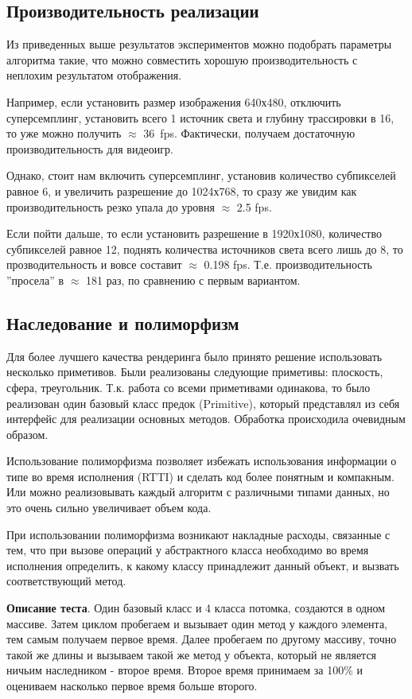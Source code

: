 \documentclass[12pt, a4paper, utf8]{article}
\begin{document}
\subsection{Производительность реализации}

Из приведенных выше результатов экспериментов можно подобрать параметры алгоритма такие, что можно совместить хорошую производительность с неплохим результатом отображения. 

Например, если установить размер изображения 640х480, отключить суперсемплинг, установить всего 1 источник света и глубину трассировки в 16, то уже можно получить $\approx$ 36~fps. Фактически, получаем достаточную производительность для видеоигр.

Однако, стоит нам включить суперсемплинг, установив количество субпикселей равное 6, и увеличить разрешение до 1024х768, то сразу же увидим как производительность резко упала до уровня $\approx$ 2.5 fps.

Если пойти дальше, то если установить разрешение в 1920х1080, количество субпикселей равное 12, поднять количества источников света всего лишь до 8, то прозводительность и вовсе составит $\approx$ 0.198 fps. Т.е. производительность ''просела'' в $\approx$ 181 раз, по сравнению с первым вариантом.

\subsection{Наследование и полиморфизм}

Для более лучшего качества рендеринга было принято решение использовать несколько приметивов. Были реализованы следующие приметивы: плоскость, сфера, треугольник. Т.к. работа со всеми приметивами одинакова, то было реализован один базовый класс предок (Primitive), который представлял из себя интерфейс для реализации основных методов. Обработка происходила очевидным образом. 

Использование полиморфизма позволяет избежать использования информации о типе во время исполнения (RTTI) и сделать код более понятным и компакным. Или можно реализовывать каждый алгоритм с различными типами данных, но это очень сильно увеличивает объем кода.

При использовании полиморфизма возникают накладные расходы, связанные с тем, что при вызове операций у абстрактного класса необходимо во время исполнения определить, к какому классу принадлежит данный объект, и вызвать соответствующий метод. 

\textbf{Описание теста}. Один базовый класс и 4 класса потомка, создаются в одном массиве. 
Затем циклом пробегаем и вызывает один метод у каждого элемента, тем самым получаем первое время.
Далее пробегаем по другому массиву, точно такой же длины и вызываем такой же метод у объекта, который не является ничьим наследником - второе время.
Второе время принимаем за 100\% и оцениваем насколько первое время больше второго. 
\end{document}
